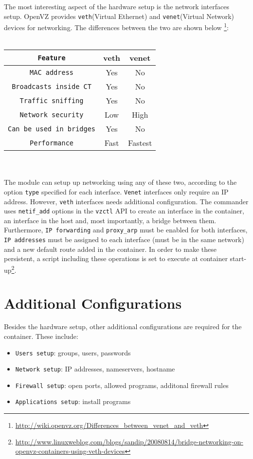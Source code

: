 The most interesting aspect of the hardware setup is the network interfaces setup. 
OpenVZ provides \texttt{veth}(Virtual Ethernet)\cite{veth} and \texttt{venet}(Virtual Network) 
devices for networking. The differences between the two are shown below
\footnote {\url {http://wiki.openvz.org/Differences_between_venet_and_veth}}:
\\
\\
\begin{tabular}{ | c | c | c | }
  \hline
  \texttt{Feature} & veth & venet \\ \hline
  \texttt{MAC address} & Yes & No \\
  \texttt{Broadcasts inside CT} & Yes & No \\
  \texttt{Traffic sniffing} & Yes & No \\
  \texttt{Network security} & Low\footnotemark[2] & High\footnotemark[3] \\
  \texttt{Can be used in bridges} & Yes & No \\
  \texttt{Performance} & Fast & Fastest \\
  \hline
\end{tabular}
\\
\\
The module can setup up networking using any of these two, according to the 
option \texttt{type} specified for each interface. \texttt{Venet} interfaces only 
require an IP address. However, \texttt{veth} interfaces needs additional configuration. 
The commander uses \texttt{netif_add} options in the \texttt{vzctl} API to create 
an interface in the container, an interface in the host and, most importantly, a 
bridge between them. Furthermore, \texttt{IP forwarding} and \texttt{proxy_arp} 
must be enabled for both interfaces,  \texttt{IP addresses} must be assigned to 
each interface (must be in the same network) and a new default route added in 
the container. In order to make these persistent, a script including these operations 
is set to execute at container start-up\footnote{\url{http://www.linuxweblog.com/blogs/sandip/20080814/bridge-networking-on-openvz-containers-using-veth-devices}}.

\section{Additional Configurations} \label{sec:openvz-extra-conf}
Besides the hardware setup, other additional configurations are required for the 
container. These include:
\begin{itemize}
  \item \texttt{Users setup}: groups, users, passwords
  \item \texttt{Network setup}: IP addresses, nameservers, hostname
  \item \texttt{Firewall setup}: open ports, allowed programs, additonal firewall rules
  \item \texttt{Applications setup}: install programs
\end{itemize}

